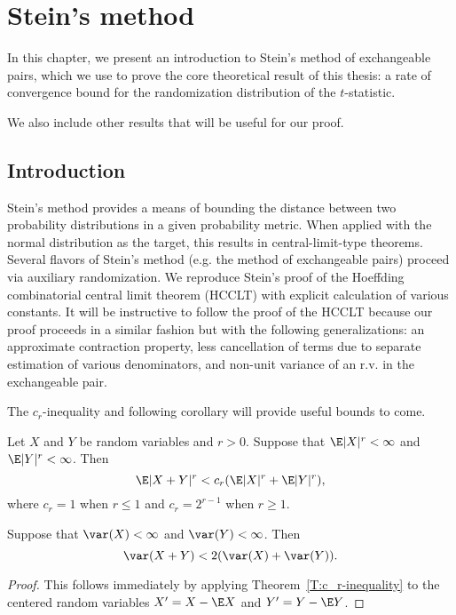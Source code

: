 \chapter{Stein's method}
\label{C:steins-method} In this chapter, we present an introduction to
Stein's method of exchangeable pairs, which we use to prove the core
theoretical result of this thesis: a rate of convergence bound for the
randomization distribution of the $t$-statistic.

We also include other results that will be useful for our proof.

\section{Introduction}
\label{S:steins-method-introduction} Stein's method provides a means
of bounding the distance between two probability distributions in a
given probability metric.  When applied with the normal distribution
as the target, this results in central-limit-type theorems.  Several
flavors of Stein's method (e.g. the method of exchangeable pairs)
proceed via auxiliary randomization.  We reproduce Stein's
\cite{stein1986approximate} proof of the Hoeffding combinatorial
central limit theorem (HCCLT) with explicit calculation of various
constants.  It will be instructive to follow the proof of the HCCLT
because our proof proceeds in a similar fashion but with the following
generalizations: an approximate contraction property, less
cancellation of terms due to separate estimation of various
denominators, and non-unit variance of an r.v. in the exchangeable
pair.

The $c_r$-inequality and following corollary will provide useful
bounds to come.
\begin{theorem}
  \label{T:c_r-inequality}
  Let $X$ and $Y$ be random variables and $r > 0$.  Suppose that
  $\E|X|^r < \infty$ and $\E|Y|^r < \infty$.  Then
  \begin{equation}
    \E|X + Y|^r < c_r(\E|X|^r+\E|Y|^r),
  \end{equation}
  where $c_r = 1$ when $r \leq 1$ and $c_r = 2^{r-1}$ when $r \geq 1$.
\end{theorem}

\begin{corollary}
  \label{C:sum_variance}
  Suppose that $\var(X) < \infty$ and $\var(Y) < \infty$.  Then
  \begin{equation}
    \var(X + Y) < 2(\var(X)+\var(Y)).
  \end{equation}
\end{corollary}
\begin{proof}
  This follows immediately by applying Theorem~\ref{T:c_r-inequality}
  to the centered random variables $X' = X - \E X$ and $Y' = Y -
  \E Y$.
\end{proof}

